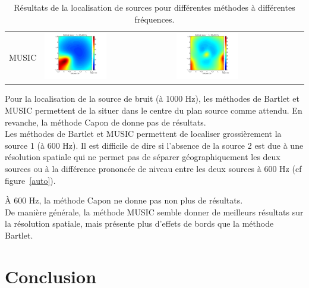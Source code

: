 \documentclass[a4paper]{article}
\begin{document}
\begin{table}[!h]
\begin{tabular}{m{} m{} m{} }
	MUSIC & \includegraphics[width=0.5\textwidth]{music_16h_600hz_2.png} &\hspace{-2cm} \includegraphics[width=0.5\textwidth]{music_16h_1000hz_5.png} 
\end{tabular}
\caption{Résultats de la localisation de sources pour différentes méthodes à différentes fréquences.\label{res}}
\end{table}


Pour la localisation de la source de bruit (à 1000 Hz), les méthodes de Bartlet et MUSIC permettent de la situer dans le centre du plan source comme attendu. En revanche, la méthode Capon de donne pas de résultats.\\


Les méthodes de Bartlet et MUSIC permettent de localiser grossièrement la source 1 (à 600 Hz). 
Il est difficile de dire si l'absence de la source 2 est due à une résolution spatiale qui ne permet pas de séparer géographiquement les deux sources ou à la différence prononcée de niveau entre les deux sources à 600 Hz (cf figure~\ref{auto}).


 À 600 Hz, la méthode Capon ne donne pas non plus de résultats.\\


De manière générale, la méthode MUSIC semble donner de meilleurs résultats sur la résolution spatiale, mais présente plus d'effets de bords que la méthode Bartlet.\\


\section{Conclusion}
\end{document}
